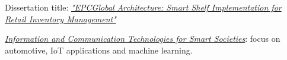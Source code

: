 \documentclass[10pt,a4paper,ragged2e,withhyper]{altacv}
\begin{document}
\begin{paracol}{2}






\switchcolumn




Dissertation title: \href{https://github.com/dvcorreia/epc-smart-shelve}{\textit{"EPCGlobal Architecture: Smart Shelf Implementation for Retail Inventory Management"}}

\divider

\href{https://www.polito.it/en/education/master-s-degree-programmes/ict-for-smart-societies}{\textit{Information and Communication Technologies for Smart Societies}}: focus on automotive, IoT applications and machine learning.

\medskip









\end{paracol}
\end{document}
